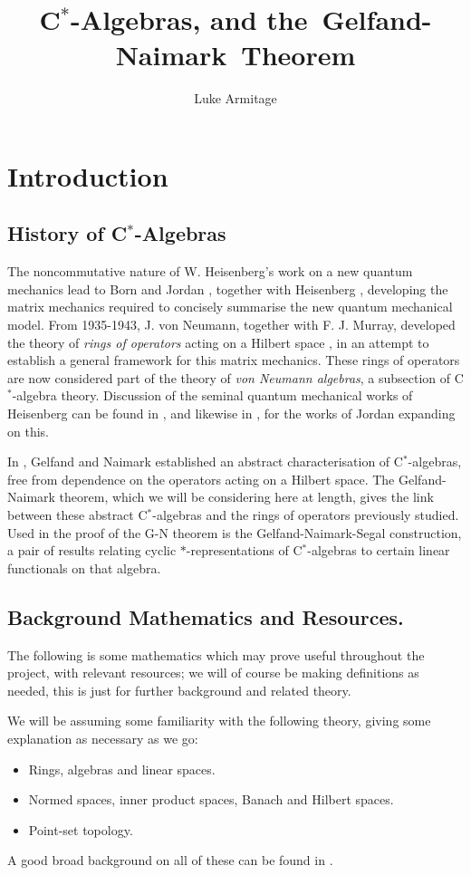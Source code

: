\documentclass[12pt,a4paper]{amsart}
\author{Luke Armitage}
\title{C$^\ast$-Algebras, and the~Gelfand-Naimark~Theorem}
\theoremstyle{plain}
\theoremstyle{definition}
\begin{document}
\maketitle
\section{Introduction}
\subsection{History of C$^\ast$-Algebras}
	The noncommutative nature of W. Heisenberg's work on a new quantum mechanics \cite{heisenberg25} lead to Born and Jordan \cite{bornjordan25}, together with Heisenberg \cite{bornjordanheisenberg25}, developing the matrix mechanics required to concisely summarise the new quantum mechanical model. 
	From 1935-1943, J. von Neumann, together with F. J. Murray, developed the theory of \emph{rings of operators} acting on a Hilbert space \cite{vonneumann35,vonneumann37,vonneumann43,vonneumann40}, in an attempt to establish a general framework for this matrix mechanics.
	These rings of operators are now considered part of the theory of \emph{von Neumann algebras}, a subsection of C$^\ast$-algebra theory. 
	Discussion of the seminal quantum mechanical works of Heisenberg can be found in \cite{mackinnon77}, and likewise in \cite{schroer03}, for the works of Jordan expanding on this.
	
	In \cite{gelfand43}, Gelfand and Naimark established an abstract characterisation of C$^\ast$-algebras, free from dependence on the operators acting on a Hilbert space.
	The Gelfand-Naimark theorem, which we will be considering here at length, gives the link between these abstract C$^\ast$-algebras and the rings of operators previously studied.
	Used in the proof of the G-N theorem is the Gelfand-Naimark-Segal construction, a pair of results relating cyclic $\ast$-representations of C$^\ast$-algebras to certain linear functionals on that algebra. 
	
	
\subsection{Background Mathematics and Resources.}	
	The following is some mathematics which may prove useful throughout the project, with relevant resources; we will of course be making definitions as needed, this is just for further background and related theory.

	We will be assuming some familiarity with the following theory, giving some explanation as necessary as we go:
\begin{itemize}
	\item Rings, algebras and linear spaces.
	\item Normed spaces, inner product spaces, Banach and Hilbert spaces.
	\item Point-set topology.
\end{itemize}
	A good broad background on all of these can be found in \cite{simmons83}.
\end{document}
